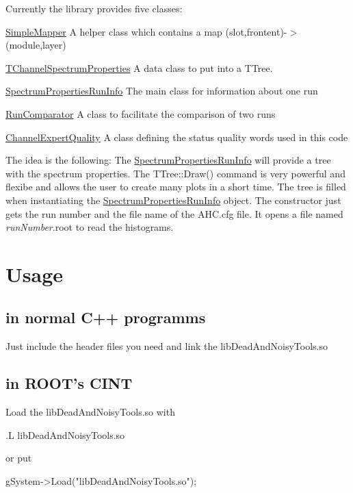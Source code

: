 Currently the library provides five classes: \begin{DoxyItemize}
\item \hyperlink{class_simple_mapper}{SimpleMapper} A helper class which contains a map (slot,frontent)-\/$>$(module,layer) \item \hyperlink{class_t_channel_spectrum_properties}{TChannelSpectrumProperties} A data class to put into a TTree. \item \hyperlink{class_spectrum_properties_run_info}{SpectrumPropertiesRunInfo} The main class for information about one run \item \hyperlink{class_run_comparator}{RunComparator} A class to facilitate the comparison of two runs \item \hyperlink{class_channel_expert_quality}{ChannelExpertQuality} A class defining the status quality words used in this code\end{DoxyItemize}
The idea is the following: The \hyperlink{class_spectrum_properties_run_info}{SpectrumPropertiesRunInfo} will provide a tree with the spectrum properties. The TTree::Draw() command is very powerful and flexibe and allows the user to create many plots in a short time. The tree is filled when instantiating the \hyperlink{class_spectrum_properties_run_info}{SpectrumPropertiesRunInfo} object. The constructor just gets the run number and the file name of the AHC.cfg file. It opens a file named {\itshape runNumber\/}.root to read the histograms.\hypertarget{rootlib_Usage}{}\section{Usage}\label{rootlib_Usage}
\hypertarget{rootlib_Cplusplus}{}\subsection{in normal C++ programms}\label{rootlib_Cplusplus}
Just include the header files you need and link the libDeadAndNoisyTools.so\hypertarget{rootlib_Root}{}\subsection{in ROOT's CINT}\label{rootlib_Root}
Load the libDeadAndNoisyTools.so with \begin{DoxyVerb}.L libDeadAndNoisyTools.so \end{DoxyVerb}
 or put \begin{DoxyVerb}gSystem->Load("libDeadAndNoisyTools.so"); \end{DoxyVerb}
